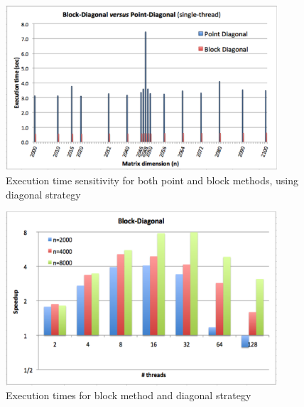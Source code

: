 \documentclass[../thesis]{subfiles}
\begin{document}
	\begin{figure}[hp]
		\begin{center}
			\includegraphics[width=0.9\textwidth]{assets/images/multicore/matrix-variations.png}
		\end{center}
		\caption{Execution time sensitivity for both point and block methods, using diagonal strategy}
		\label{fig:multicore:sensitivity}
	\end{figure}

	\begin{figure}[hp]
		\begin{center}
			\includegraphics[width=0.9\textwidth]{assets/images/multicore/block-diagonal.png}
		\end{center}
		\caption{Execution times for block method and diagonal strategy}
		\label{fig:multicore:block:diagonal:times}
	\end{figure}
\end{document}
